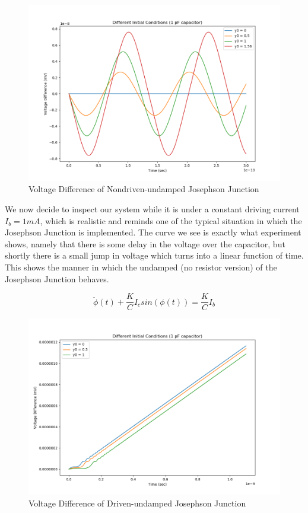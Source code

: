 \documentclass[12pt]{article}
\begin{document}
\begin{figure}
\caption{Voltage Difference of Nondriven-undamped Josephson Junction}
\begin{center}
\includegraphics[scale=0.50]{uud-jjinitv.png}
\end{center}
\end{figure}


We now decide to inspect our system while it is under a constant driving current $I_b=1mA$, which is realistic and reminds one of the typical situation in which the Josephson Junction is implemented.  The curve we see is exactly what experiment shows, namely that there is some delay in the voltage over the capacitor, but shortly there is a small jump in voltage which turns into a linear function of time.  This shows the manner in which the undamped (no resistor version) of the Josephson Junction behaves.

\begin{equation}
\ddot{\phi}(t) + \dfrac{K}{C} I_c sin(\phi(t)) = \dfrac{K}{C} I_b
\end{equation}

\begin{figure}
\caption{Voltage Difference of Driven-undamped Josephson Junction}
\begin{center}
\includegraphics[scale=0.50]{ud-jjinitv.png}
\end{center}
\end{figure}
\end{document}
